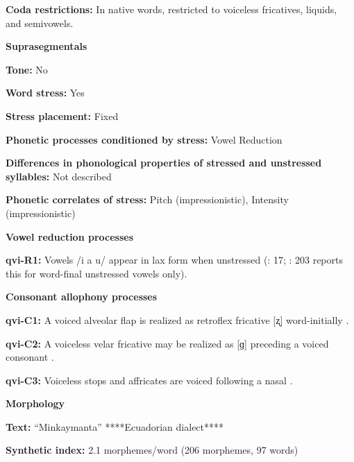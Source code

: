 \textbf{Coda restrictions:} In native words, restricted to voiceless fricatives, liquids, and semivowels.



\textbf{Suprasegmentals}



\textbf{Tone:} No



\textbf{Word stress:} Yes



\textbf{Stress placement:} Fixed



\textbf{Phonetic processes conditioned by stress:} Vowel Reduction



\textbf{Differences in phonological properties of stressed and unstressed syllables:} Not described



\textbf{Phonetic correlates of stress:} Pitch (impressionistic), Intensity (impressionistic)



\textbf{Vowel reduction processes}



\textbf{qvi-R1:} Vowels /i a u/ appear in lax form when unstressed (\citealt{Jake1983}: 17; \citealt{Cole1982}: 203 reports this for word-final unstressed vowels only).



\textbf{Consonant allophony processes}



\textbf{qvi-C1:} A voiced alveolar flap is realized as retroflex fricative [ʐ] word-initially \citep[202]{Cole1982}.



\textbf{qvi-C2:} A voiceless velar fricative may be realized as [ɡ] preceding a voiced consonant \citep[201]{Cole1982}.



\textbf{qvi-C3:} Voiceless stops and affricates are voiced following a nasal \citep[200]{Cole1982}.



\textbf{Morphology}



\textbf{Text:} “Minkaymanta” \citep[442-55]{Carpenter1982} ****Ecuadorian dialect****



\textbf{Synthetic index:} 2.1 morphemes/word (206 morphemes, 97 words)



